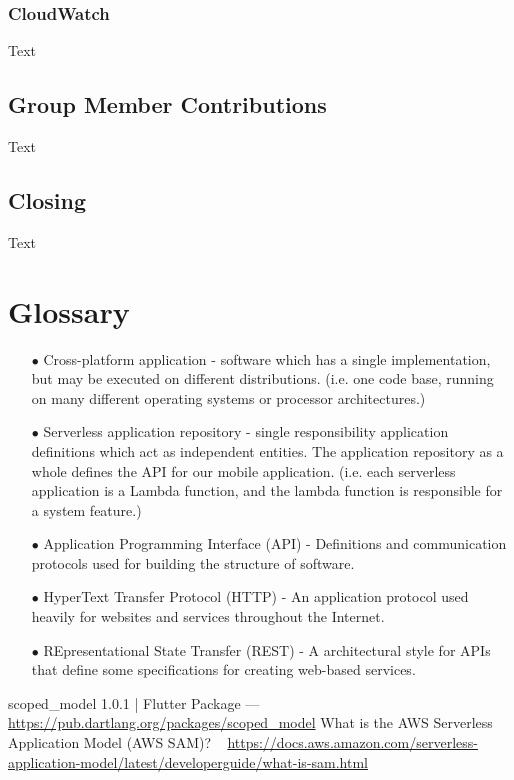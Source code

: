 \documentclass[10pt, a4paper]{article}
\begin{document}
\subsubsection{CloudWatch}
Text

\subsection{Group Member Contributions}
Text

\subsection{Closing}
Text


\section{Glossary}
\begin{enumerate}
	\item[$\bullet$] Cross-platform application - software which has a single implementation, but may be executed on different distributions. (i.e. one code base, running on many different operating systems or processor architectures.)
	\item[$\bullet$] Serverless application repository - single responsibility application definitions which act as independent entities. The application repository as a whole defines the API for our mobile application. (i.e. each serverless application is a Lambda function, and the lambda function is responsible for a system feature.)
	\item[$\bullet$] Application Programming Interface (API) - Definitions and communication protocols used for building the structure of software.
	\item[$\bullet$] HyperText Transfer Protocol (HTTP) - An application protocol used heavily for websites and services throughout the Internet.
	\item[$\bullet$] REpresentational State Transfer (REST) - A architectural style for APIs that define some specifications for creating web-based services.
\end{enumerate}

\begin{thebibliography}{9}
scoped\_model 1.0.1 | Flutter Package --- \url{https://pub.dartlang.org/packages/scoped_model}
What is the AWS Serverless Application Model (AWS SAM)? ~ \url{https://docs.aws.amazon.com/serverless-application-model/latest/developerguide/what-is-sam.html}
\end{thebibliography}

\begin{appendix}
	\listoffigures
\end{appendix}
\end{document}
